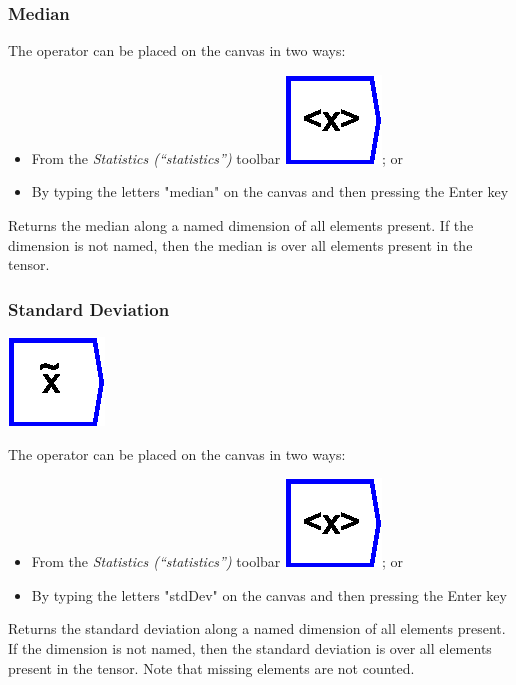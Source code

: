 \subsubsection{Median}

\label{Operation:median}

The operator can be placed on the canvas in two ways:
\begin{itemize}
\item From the \emph{Statistics (``statistics'')} toolbar \includegraphics{images/mean};
or 
\item By typing the letters "median" on the canvas and then pressing the
Enter key
\end{itemize}
Returns the median along a named dimension of all elements present.
If the dimension is not named, then the median is over all elements
present in the tensor.

\subsubsection{Standard Deviation}

\label{Operation:stdDev}

\includegraphics{images/median}

The operator can be placed on the canvas in two ways:
\begin{itemize}
\item From the \emph{Statistics (``statistics'')} toolbar \includegraphics{images/mean};
or 
\item By typing the letters "stdDev" on the canvas and then pressing the
Enter key
\end{itemize}
Returns the standard deviation along a named dimension of all elements
present. If the dimension is not named, then the standard deviation
is over all elements present in the tensor. Note that missing elements
are not counted.

